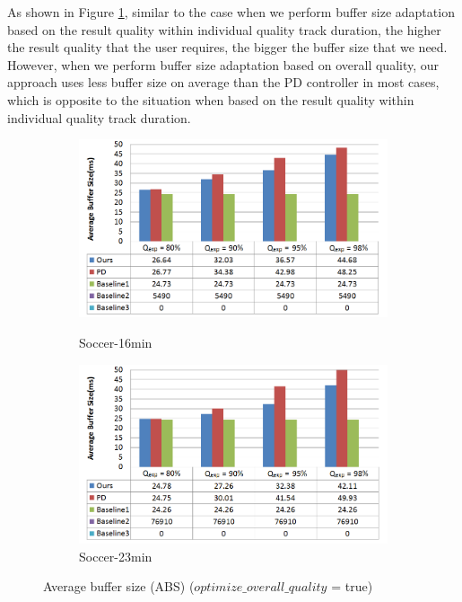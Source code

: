 \documentclass[a4paper, 11pt, twoside]{report}
\begin{document}
\clearpage

As shown in Figure \ref{fig:average-buffer-size-overallquality}, similar to the case when we perform buffer size adaptation based on the result quality within individual quality track duration, the higher the result quality that the user requires, the bigger the buffer size that we need. However, when we perform buffer size adaptation based on overall quality, our approach uses less buffer size on average than the PD controller in most cases, which is opposite to the situation when based on the result quality within individual quality track duration.\\

\begin{figure}[H]
	\centering
	\begin{subfigure}[t]{5in}
		\centering
		\includegraphics[width=5in]{average-buffer-size-16min-overallquality}
		\caption{Soccer-16min}
		\hspace{5pt}
		\includegraphics[width=5in]{average-buffer-size-23min-overallquality}
		\caption{Soccer-23min}	
	\end{subfigure}
	\caption{Average buffer size (ABS) ($optimize\_overall\_quality$ = true)}
	\label{fig:average-buffer-size-overallquality}
\end{figure}
\end{document}
